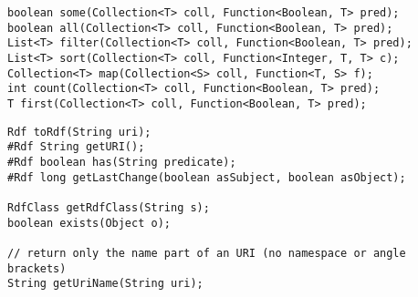 \begin{small}
\begin{lstlisting}
boolean some(Collection<T> coll, Function<Boolean, T> pred);
boolean all(Collection<T> coll, Function<Boolean, T> pred);
List<T> filter(Collection<T> coll, Function<Boolean, T> pred);
List<T> sort(Collection<T> coll, Function<Integer, T, T> c);
Collection<T> map(Collection<S> coll, Function<T, S> f);
int count(Collection<T> coll, Function<Boolean, T> pred);
T first(Collection<T> coll, Function<Boolean, T> pred);
\end{lstlisting}
\end{small}

\begin{small}
\begin{lstlisting}
Rdf toRdf(String uri);
#Rdf String getURI();
#Rdf boolean has(String predicate);
#Rdf long getLastChange(boolean asSubject, boolean asObject);

RdfClass getRdfClass(String s);
boolean exists(Object o);

// return only the name part of an URI (no namespace or angle brackets)
String getUriName(String uri);
\end{lstlisting}
\end{small}



